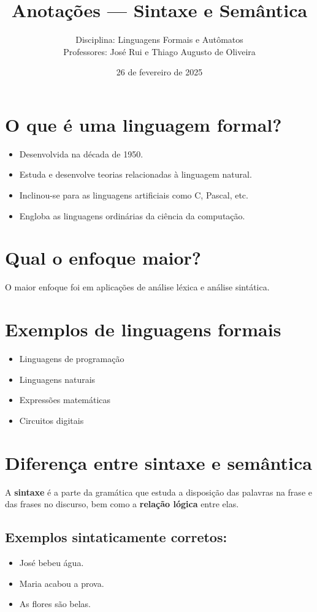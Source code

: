 \documentclass[12pt]{article}
\title{Anotações — Sintaxe e Semântica}
\author{Disciplina: Linguagens Formais e Autômatos\\Professores: José Rui e Thiago Augusto de Oliveira}
\date{26 de fevereiro de 2025}
\begin{document}
\maketitle

\section*{O que é uma linguagem formal?}
\begin{itemize}
    \item Desenvolvida na década de 1950.
    \item Estuda e desenvolve teorias relacionadas à linguagem natural.
    \item Inclinou-se para as linguagens artificiais como C, Pascal, etc.
    \item Engloba as linguagens ordinárias da ciência da computação.
\end{itemize}

\section*{Qual o enfoque maior?}
O maior enfoque foi em aplicações de análise léxica e análise sintática.

\section*{Exemplos de linguagens formais}
\begin{itemize}
    \item Linguagens de programação
    \item Linguagens naturais
    \item Expressões matemáticas
    \item Circuitos digitais
\end{itemize}

\section*{Diferença entre sintaxe e semântica}

A \textbf{sintaxe} é a parte da gramática que estuda a disposição das palavras na frase e das frases no discurso, bem como a \textbf{relação lógica} entre elas.

\subsection*{Exemplos sintaticamente corretos:}
\begin{itemize}
    \item José bebeu água.
    \item Maria acabou a prova.
    \item As flores são belas.
\end{itemize}
\end{document}
